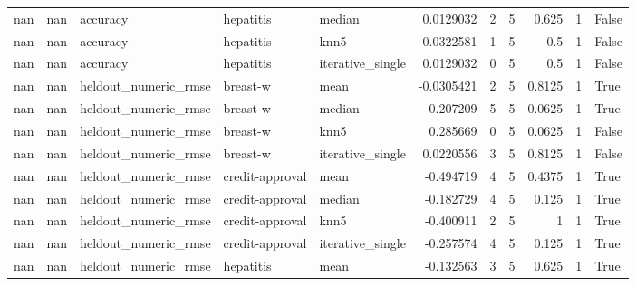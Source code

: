 \begin{table}[ht]
\begin{tabular}{rrlllrrrrrl}
        nan &     nan & accuracy                       & hepatitis       & median           &      0.0129032   &                   2 &       5 &    0.625  &        1 & False              \\
        nan &     nan & accuracy                       & hepatitis       & knn5             &      0.0322581   &                   1 &       5 &    0.5    &        1 & False              \\
        nan &     nan & accuracy                       & hepatitis       & iterative\_single &      0.0129032   &                   0 &       5 &    0.5    &        1 & False              \\
        nan &     nan & heldout\_numeric\_rmse           & breast-w        & mean             &     -0.0305421   &                   2 &       5 &    0.8125 &        1 & True               \\
        nan &     nan & heldout\_numeric\_rmse           & breast-w        & median           &     -0.207209    &                   5 &       5 &    0.0625 &        1 & True               \\
        nan &     nan & heldout\_numeric\_rmse           & breast-w        & knn5             &      0.285669    &                   0 &       5 &    0.0625 &        1 & False              \\
        nan &     nan & heldout\_numeric\_rmse           & breast-w        & iterative\_single &      0.0220556   &                   3 &       5 &    0.8125 &        1 & False              \\
        nan &     nan & heldout\_numeric\_rmse           & credit-approval & mean             &     -0.494719    &                   4 &       5 &    0.4375 &        1 & True               \\
        nan &     nan & heldout\_numeric\_rmse           & credit-approval & median           &     -0.182729    &                   4 &       5 &    0.125  &        1 & True               \\
        nan &     nan & heldout\_numeric\_rmse           & credit-approval & knn5             &     -0.400911    &                   2 &       5 &    1      &        1 & True               \\
        nan &     nan & heldout\_numeric\_rmse           & credit-approval & iterative\_single &     -0.257574    &                   4 &       5 &    0.125  &        1 & True               \\
        nan &     nan & heldout\_numeric\_rmse           & hepatitis       & mean             &     -0.132563    &                   3 &       5 &    0.625  &        1 & True               \\

\end{tabular}
\end{table}
